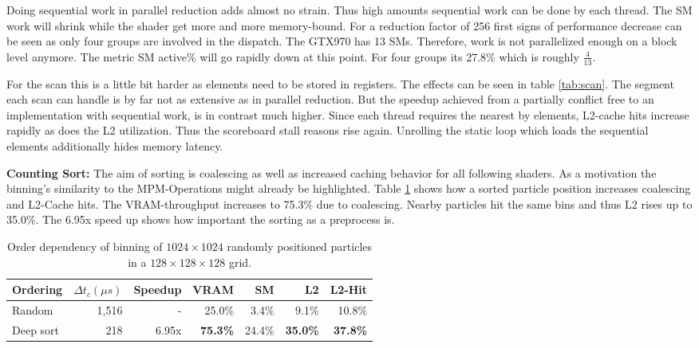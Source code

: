 \documentclass[m,times]{cgMA}
\begin{document}
Doing sequential work in parallel reduction adds almost no strain. Thus high amounts sequential work can be done by each thread. The SM work will shrink while the shader get more and more memory-bound. For a reduction factor of 256 first signs of performance decrease can be seen as only four groups are involved in the dispatch. The GTX970 has 13 SMs. Therefore, work is not parallelized enough on a block level anymore. The metric SM active\% will go rapidly down at this point. For four groups its 27.8\% which is roughly $\frac{4}{13}$.

For the scan this is a little bit harder as elements need to be stored in registers. The effects can be seen in table \ref{tab:scan}. The segment each scan can handle is by far not as extensive as in parallel reduction. But the speedup achieved from a partially conflict free to an implementation with sequential work, is in contrast much higher. Since each thread requires the nearest by elements, L2-cache hits increase rapidly as does the L2 utilization. Thus the scoreboard stall reasons rise again. Unrolling the static loop which loads the sequential elements additionally hides memory latency.

\textbf{Counting Sort:} The aim of sorting is coalescing as well as increased caching behavior for all following shaders. As a motivation the binning's similarity to the MPM-Operations might already be highlighted. Table \ref{table:bin} shows how a sorted particle position increases coalescing and L2-Cache hits. The VRAM-throughput increases to 75.3\% due to coalescing. Nearby particles hit the same bins and thus L2 rises up to 35.0\%. The 6.95x speed up shows how important the sorting as a preprocess is.
\begin{table}[htbp]
  \begin{tabular}{ | l | r | r | r | r | r | r |}    \hline
    Ordering            &  $\Delta t_c (\mu s)$ & Speedup &VRAM              & SM      & L2     & L2-Hit \\\hline
    Random              &  1,516                & -       &25.0\%            & 3.4\%   & 9.1\%  & 10.8\% \\\hline
    Deep sort           &    218                & 6.95x   &\textbf{75.3\%}   & 24.4\%  & \textbf{35.0\%} & \textbf{37.8\%} \\
    \hline
 \end{tabular}
\caption{Order dependency of binning of $1024\times1024$ randomly positioned particles in a $128\times128\times128$ grid.}\label{table:bin}
\end{table}
\end{document}
